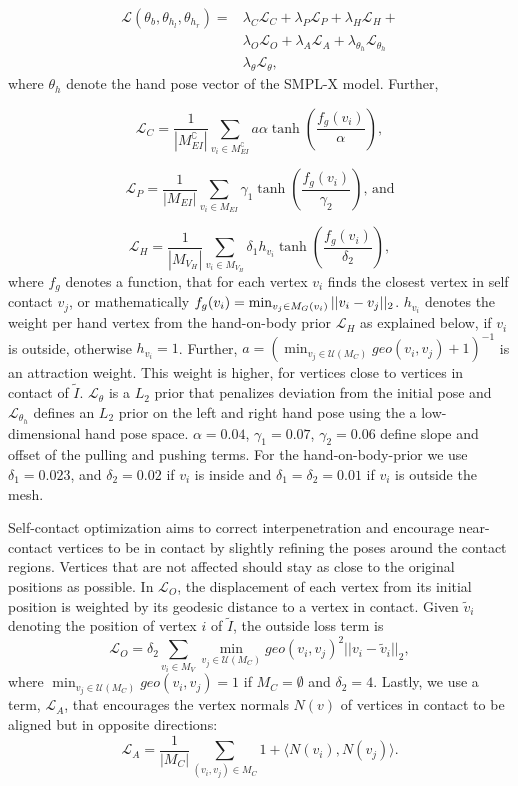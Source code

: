 \documentclass[final]{cvpr}
\newcommand{\inp}[2]{\langle #1, #2 \rangle}
\theoremstyle{definition}
\begin{document}
\begin{align}
\label{eq-selfcontactoptimization}
\mathcal{L}(\theta_b, \theta_{h_l}, \theta_{h_r}) = & \lambda_{C} \mathcal{L}_{C} + \lambda_{P} \mathcal{L}_{P} +  \lambda_{H} \mathcal{L}_{H} + \nonumber \\
& \lambda_{O} \mathcal{L}_{O} + \lambda_{A} \mathcal{L}_{A} + \lambda_{\theta_h} \mathcal{L}_{\theta_h} \\
& \lambda_{\theta} \mathcal{L}_{\theta},
\end{align}
where $\theta_{h}$ denote the hand pose vector of the SMPL-X model. Further, 

$$ \mathcal{L}_{C} = \frac{1}{|M_{EI}^\complement|} \sum_{v_i \in M_{EI}^\complement} a \alpha 
 \tanh(\frac{f_{g}(v_i)}{\alpha}),$$

$$ \mathcal{L}_{P} = \frac{1}{|M_{EI}|} \sum_{v_i \in M_{EI}} \gamma_1 \tanh(\frac{f_{g}(v_i)}{\gamma_2}) \text{, and}$$

$$ \mathcal{L}_{H} = \frac{1}{|M_{V_H}|} \sum_{v_i \in M_{V_H}} \delta_1 h_{v_i} \tanh(\frac{f_{g}(v_i)}{\delta_2}),$$
where $f_{g}$ denotes a function, that for each vertex $v_i$ finds the closest vertex in self contact $v_j$, or mathematically $f_{g}(v_i) = \min_{v_j \in \mathnormal{M}_{G}(v_i)} || v_i - v_j||_2$. $h_{v_i}$ denotes the weight per hand vertex from the hand-on-body prior $\mathcal{L}_H$ as explained below, if $v_i$ is outside, otherwise $h_{v_i}=1$. Further, $a= (\min_{v_j \in \mathcal{U}(M_C)} geo(v_i,v_j) + 1)^{-1}$ is an attraction weight. This weight is higher, for vertices close to vertices in contact of $\tilde{I}$. $\mathcal{L}_{\theta}$ is a $L_2$ prior that penalizes deviation from the initial pose and $\mathcal{L}_{\theta_h}$ defines an  $L_2$ prior on the left and right hand pose using the a low-dimensional hand pose space.
$\alpha = 0.04$, $\gamma_1 = 0.07$, $\gamma_2=0.06$ define slope and offset of the pulling and pushing terms. For the hand-on-body-prior we use $\delta_1 = 0.023$, and $\delta_2 = 0.02$ if $v_i$ is inside and $\delta_1 = \delta_2 = 0.01$ if $v_i$ is outside the mesh.

Self-contact optimization aims to correct interpenetration and encourage near-contact vertices to be in contact by slightly refining the poses around the contact regions. 
Vertices that are not affected should stay as close to the original positions as possible.
In $\mathcal{L}_{O}$, the displacement of each vertex from its initial position is weighted by its geodesic distance to a vertex in contact. 
Given $\tilde{v}_i$ denoting the position of vertex $i$ of $\tilde{I}$, the outside loss term is
$$\mathcal{L}_{O} = \delta_2 \sum_{v_i \in M_V}  \min_{v_j \in \mathcal{U}(M_C)} geo(v_i,v_j)^2 ||v_i - \tilde{v}_i||_2,$$
where $\min_{v_j \in \mathcal{U}(M_C)} geo(v_i,v_j) = 1$ if $M_C = \emptyset$ and $\delta_2 = 4$. 
Lastly, we use a term, $\mathcal{L}_{A}$, that encourages the vertex normals $N(v)$ of vertices in contact to be aligned but in opposite directions:
$$ \mathcal{L}_{A} = \frac{1}{|M_{C}|} \sum_{(v_i, v_j) \in M_C} 1 + \inp{N(v_i)}{N(v_j)}.$$
\end{document}
